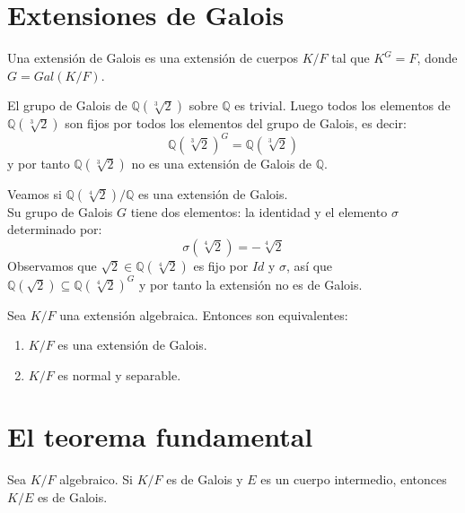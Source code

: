 \section{Extensiones de Galois}

\begin{definition}
    Una extensión de Galois es una extensión de cuerpos $K/F$ tal que $K^G = F$, donde $G = Gal(K/F)$.
\end{definition}

\begin{example}
    El grupo de Galois de $\mathbb{Q}(\sqrt[3]{2})$ sobre $\mathbb{Q}$ es trivial.
    Luego todos los elementos de $\mathbb{Q}(\sqrt[3]{2})$ son fijos por todos los elementos del grupo de Galois, es decir:
    $$\mathbb{Q}(\sqrt[3]{2})^G = \mathbb{Q}(\sqrt[3]{2})$$
    y por tanto $\mathbb{Q}(\sqrt[3]{2})$ no es una extensión de Galois de $\mathbb{Q}$.
\end{example}

\begin{example}
    Veamos si $\mathbb{Q}(\sqrt[4]{2})/\mathbb{Q}$ es una extensión de Galois.\\
    Su grupo de Galois $G$ tiene dos elementos: la identidad y el elemento $\sigma$ determinado por:
    $$\sigma(\sqrt[4]{2}) = -\sqrt[4]{2}$$
    Observamos que $\sqrt{2} \in \mathbb{Q}(\sqrt[4]{2})$ es fijo por $Id$ y $\sigma$, así que $\mathbb{Q}(\sqrt{2}) \subseteq \mathbb{Q}(\sqrt[4]{2})^G$ y por tanto la extensión no es de Galois.
\end{example}

\begin{theorem}
    Sea $K/F$ una extensión algebraica. Entonces son equivalentes:
    \begin{enumerate}
        \item $K/F$ es una extensión de Galois.
        \item $K/F$ es normal y separable.
    \end{enumerate}
\end{theorem}

\section{El teorema fundamental}

\begin{proposition}
    Sea $K/F$ algebraico. Si $K/F$ es de Galois y $E$ es un cuerpo intermedio, entonces $K/E$ es de Galois.
\end{proposition}

